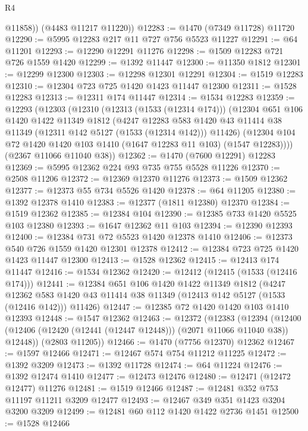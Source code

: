 \begin{lexlean}{R4}
\begin{coremodule}
          @11858))
      (@4483 @11217 @11220))
@12283 := @1470 (@7349 @11728) @11720
@12290 := @5995 @12283 @217 @11 @727 @756 @5523 @11227
@12291 := @64 @11201
@12293 := @12290 @12291 @11276
@12298 := @1509 @12283 @721 @726 @1559 @1420
@12299 := @1392 @11447
@12300 := @11350 @1812
@12301 := @12299 @12300
@12303 := @12298 @12301 @12291
@12304 := @1519 @12283
@12310 := @12304 @723 @725 @1420 @1423 @11447 @12300
@12311 := @1528 @12283
@12313 := @12311 @174 @11447
@12314 := @1534 @12283
@12359 := @12293
    (@12303
      (@12310
        (@12313 (@1533 (@12314 @174)))
        (@12304
          @651
          @106
          @1420
          @1422
          @11349
          @1812
          (@4247
            @12283
            @583
            @1420
            @43
            @11414
            @38
            @11349
            (@12311 @142 @5127 (@1533 (@12314 @142)))
            @11426)
          (@12304 @104 @72 @1420 @1420 @103 @1410 (@1647 @12283 @11 @103) (@1547 @12283))))
      (@2367 @11066 @11040 @38))
@12362 := @1470 (@7600 @12291) @12283
@12369 := @5995 @12362 @224 @93 @735 @755 @5528 @11226
@12370 := @2508 @11206
@12372 := @12369 @12370 @11276
@12373 := @1509 @12362
@12377 := @12373 @55 @734 @5526 @1420
@12378 := @64 @11205
@12380 := @1392 @12378 @1410
@12383 := @12377 (@1811 @12380) @12370
@12384 := @1519 @12362
@12385 := @12384 @104
@12390 := @12385 @733 @1420 @5525 @103 @12380
@12393 := @1647 @12362 @11 @103
@12394 := @12390 @12393
@12400 := @12384 @731 @72 @5523 @1420 @12378 @1410
@12406 := @12373 @540 @726 @1559 @1420 @12301 @12378
@12412 := @12384 @723 @725 @1420 @1423 @11447 @12300
@12413 := @1528 @12362
@12415 := @12413 @174 @11447
@12416 := @1534 @12362
@12420 := @12412 (@12415 (@1533 (@12416 @174)))
@12441 := @12384
    @651
    @106
    @1420
    @1422
    @11349
    @1812
    (@4247 @12362 @583 @1420 @43 @11414 @38 @11349 (@12413 @142 @5127 (@1533 (@12416 @142))) @11426)
@12447 := @12385 @72 @1420 @1420 @103 @1410 @12393
@12448 := @1547 @12362
@12463 := @12372
    (@12383
      (@12394 (@12400 (@12406 (@12420 (@12441 (@12447 @12448))) (@2071 @11066 @11040 @38)) @12448))
      (@2803 @11205))
@12466 := @1470 (@7756 @12370) @12362
@12467 := @1597 @12466
@12471 := @12467 @574 @754 @11212 @11225
@12472 := @1392 @3209
@12473 := @1392 @11728
@12474 := @64 @11224
@12476 := @1392 @12474 @1410
@12477 := @12473 @12476
@12480 := @12471 (@12472 @12477) @11276
@12481 := @1519 @12466
@12487 := @12481 @352 @753 @11197 @11211 @3209 @12477
@12493 := @12467 @349 @351 @1423 @3204 @3200 @3209
@12499 := @12481 @60 @112 @1420 @1422 @2736 @1451
@12500 := @1528 @12466

\end{coremodule}
\end{lexlean}

